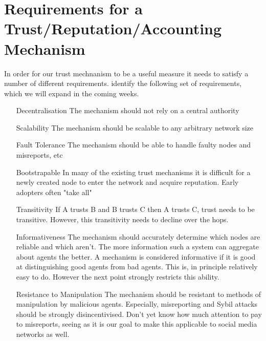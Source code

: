 \documentclass[11pt,a4paper]{article}
\theoremstyle{definition}
\theoremstyle{theorem}
\theoremstyle{proposition}
\theoremstyle{corollary}
\theoremstyle{lemma}
\theoremstyle{example}
\theoremstyle{remark}
\begin{document}
\section{Requirements for a Trust/Reputation/Accounting Mechanism}
\label{sec:Requirements for a Trust/Reputation/Accounting Mechanism}
In order for our trust mechnanism to be a useful measure it needs to satisfy a number of different requirements. \cite{Trust in Distributed Systems} identify the following set of requirements, which we will expand in the coming weeks.
\begin{itemize}
\item[Decentralisation] The mechanism should not rely on a central authority
\item[Scalability] The mechanism should be scalable to any arbitrary network size
\item[Fault Tolerance] The mechanism should be able to handle faulty nodes and misreports, etc
\item[Bootstrapable] In many of the existing trust mechanisms it is difficult for a newly created node to enter the network and acquire reputation. Early adopters often "take all" 
\item[Transitivity] If A trusts B and B trusts C then A trusts C, trust needs to be transitive. However, this transitivity needs to decline over the hops. 
\item[Informativeness] The mechanism should accurately determine which nodes are reliable and which aren't. The more information such a system can aggregate about agents the better. A mechanism is considered informative if it is good at distinguishing good agents from bad agents. This is, in principle relatively easy to do. However the next point strongly restricts this ability.
\item[Resistance to Manipulation] The mechanism should be resistant to methods of manipulation by malicious agents. Especially, misreporting and Sybil attacks should be strongly disincentivised. Don't yet know how much attention to pay to misreports, seeing as it is our goal to make this applicable to social media networks as well. 
\end{itemize} 
\end{document}

